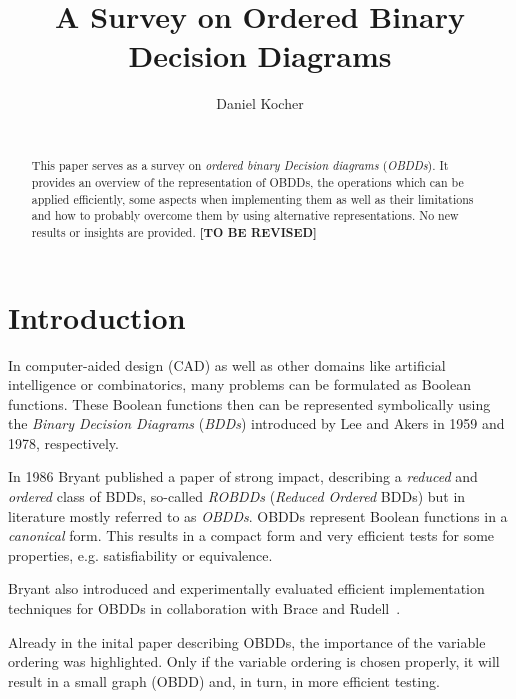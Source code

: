 \documentclass{vldb}
\newcommand{\tbr}{\textbf{[TO BE REVISED]}}
\begin{document}
\title{A Survey on Ordered Binary Decision Diagrams}


\author{
\alignauthor
	Daniel Kocher\\
    \\
}

\maketitle

\begin{abstract}
This paper serves as a survey on \textit{ordered binary Decision diagrams}
(\textit{OBDDs}). It provides an overview of the representation of OBDDs, the
operations which can be applied efficiently, some aspects when implementing them
as well as their limitations and how to probably overcome them by using
alternative representations. No new results or insights are provided. \tbr
\end{abstract}

\section{Introduction}
\label{sec:introduction}

In computer-aided design (CAD) as well as other domains like artificial
intelligence or combinatorics, many problems can be formulated as Boolean
functions. These Boolean functions then can be represented symbolically using the
\textit{Binary Decision Diagrams} (\textit{BDDs}) introduced by Lee\cite{LEE59}
and Akers\cite{AKERS78} in 1959 and 1978, respectively.

In 1986 Bryant\cite{BRYANT86} published a paper of strong impact, describing a
\textit{reduced} and \textit{ordered} class of BDDs, so-called \textit{ROBDDs}
(\textit{Reduced Ordered} BDDs) but in literature mostly referred to as
\textit{OBDDs}. OBDDs represent Boolean functions in a \textit{canonical}
form. This results in a compact form and very efficient tests for some properties,
e.g. satisfiability or equivalence\cite{BRYANT86}.

Bryant also introduced and experimentally evaluated efficient implementation
techniques for OBDDs in collaboration with Brace and
Rudell~\cite{BRACE90, BRYANT92}.

Already in the inital paper describing OBDDs, the importance of the variable
ordering was highlighted. Only if the variable ordering is chosen properly, it
will result in a small graph (OBDD) and, in turn, in more efficient testing.
\end{document}
